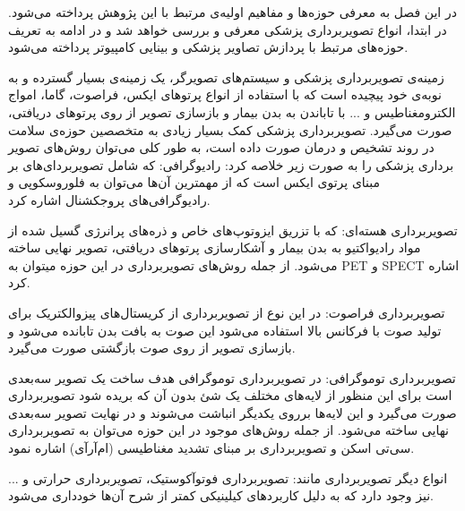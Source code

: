 

در این فصل به معرفی حوزه‌ها و مفاهیم اولیه‌ی مرتبط با این پژوهش پرداخته می‌شود. در ابتدا، انواع تصویربرداری پزشکی معرفی و بررسی خواهد شد و در ادامه به تعریف حوزه‌های مرتبط با پردازش تصاویر پزشکی و بینایی کامپیوتر پرداخته می‌شود.



زمینه‌ی تصویربرداری پزشکی و سیستم‌های تصویرگر، یک زمینه‌ی بسیار گسترده و به نوبه‌ی خود پیچیده است که با استفاده از انواع پرتوهای ایکس، فراصوت، گاما، امواج الکترومغناطیس و ... با تاباندن به بدن بیمار و بازسازی تصویر از روی پرتوهای دریافتی، صورت می‌‌گیرد. تصویربرداری پزشکی کمک بسیار زیادی به متخصصین حوزه‌ی سلامت در روند تشخیص و درمان صورت داده است، به طور کلی می‌توان روش‌های تصویر برداری پزشکی را به صورت زیر خلاصه کرد:
 رادیوگرافی: که شامل تصویربردای‌های بر مبنای پرتوی ایکس است که از مهمترین آن‌ها می‌توان به فلوروسکوپی و رادیوگرافی‌های پروجکشنال اشاره کرد.

 تصویربرداری هسته‌ای: که با تزریق ایزوتوپ‌های خاص و ذره‌های پرانرژی گسیل شده از مواد رادیواکتیو به بدن بیمار و آشکارسازی پرتوهای دریافتی، تصویر نهایی ساخته می‌شود. از جمله روش‌های تصویربرداری در این حوزه میتوان به PET  و SPECT  اشاره کرد.

 تصویربرداری فراصوت: در این نوع از تصویربرداری از کریستال‌های پیزوالکتریک برای تولید صوت با فرکانس بالا استفاده می‌شود این صوت به بافت بدن تابانده می‌شود و بازسازی تصویر از روی صوت بازگشتی صورت می‌گیرد. 

 تصویربرداری توموگرافی: در تصویربرداری توموگرافی هدف ساخت یک تصویر سه‌بعدی است برای این منظور از لایه‌های مختلف یک شئ بدون آن که بریده شود تصویربرداری صورت می‌گیرد و این لایه‌ها برروی یکدیگر انباشت می‌شوند و در نهایت تصویر سه‌بعدی نهایی ساخته می‌شود. از جمله روش‌های موجود در این حوزه می‌توان به تصویربرداری سی‌تی اسکن و تصویربرداری بر مبنای تشدید مغناطیسی (ام‌آرآی) اشاره نمود.

 انواع دیگر تصویربرداری مانند: تصویربرداری فوتوآکوستیک، تصویربرداری حرارتی و ... نیز وجود دارد که به دلیل کاربردهای کیلینیکی کمتر از شرح آن‌ها خودداری می‌شود.

